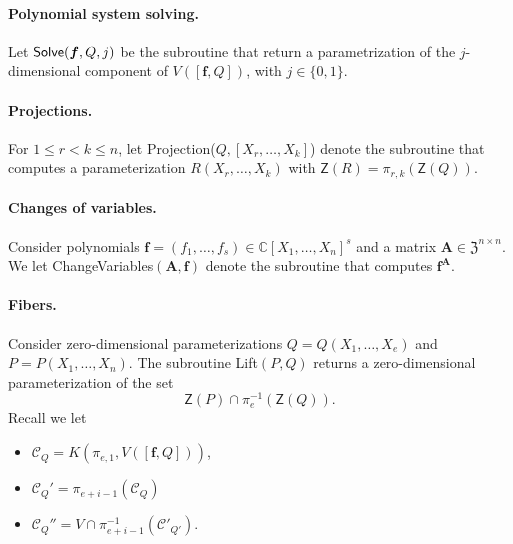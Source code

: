 \documentclass[12pt]{article}
\def\mA{{\bm A}}
\def\C{\mathbb{C}}
\def\Zeroes{\mathsf{Z}}
\def\Lift{{\sf Lift}}
\def\ChangeVariables{{\sf ChangeVariables}}
\def\Solve{{\sf Solve}}
\def\Projection{{\sf Projection}}
\def\Z{\mathfrak{Z}}
\def\mA{{\bm A}}
\def\C{\mathbb{C}}
\begin{document}
\paragraph*{Polynomial system solving.}
Let $\Solve(\bm f, Q, j)$ be the subroutine that return a parametrization of the $j$-dimensional component of $V([\bm f, Q])$, with $j \in \{0,1\}$.






\paragraph*{Projections.}
For $1 \leq r < k \leq n$, let {\Projection}($Q,[X_{r},\hdots,X_{k}]$) denote the subroutine that computes a parameterization $R(X_{r},\hdots,X_{k})$ with $\Zeroes(R) = \pi_{r,k}(\Zeroes(Q)).$








\paragraph*{Changes of variables.} 
Consider polynomials $\bm f = (f_1,\hdots,f_s) \in \C[X_1,\hdots,X_n]^s$ and a matrix $\bm A \in \Z^{n \times n}.$ We let {\ChangeVariables}$(\bm A, \bm f)$ denote the subroutine that computes $\bm f^\mA.$ 







\paragraph*{Fibers.}
Consider zero-dimensional parameterizations $Q= Q(X_1,\hdots,X_e)$ and $P = P(X_1,\hdots,X_n)$. The subroutine {\Lift}$(P,Q)$ returns a zero-dimensional parameterization of the set \[\Zeroes(P) \cap \pi_e^{-1}(\Zeroes(Q)).\] 
\noindent 
Recall we let 
%
\begin{itemize}
    \item $\mathscr{C}_Q = K(\pi_{e,1}, V([\bm f,Q]))$, 
    \item $\mathscr{C}_Q' = \pi_{e+i-1}(\mathscr{C}_Q)$
    \item $\mathscr{C}_Q'' = V \cap \pi_{e+i-1}^{-1}(\mathscr{C}'_{Q'})$.
\end{itemize}
%
\end{document}
